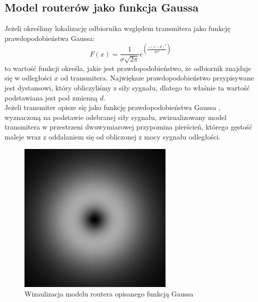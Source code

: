 \subsection{Model routerów jako funkcja Gaussa}
Jeżeli określimy lokalizację odbiornika względem transmitera jako funkcję prawdopodobieństwa Gaussa:
\begin{equation}
F(x) = \frac{1}{\sigma\sqrt{2\pi}}e^{\left(\frac{-(x-d)^2}{2\sigma^2}\right)}
\end{equation}
to wartość funkcji określa, jakie jest prawdopodobieństwo, że odbiornik znajduje się w odległości $x$ od transmitera. Największe prawdopodobieństwo przypisywane jest dystansowi, który obliczyliśmy z siły sygnału, dlatego to właśnie ta wartość podstawiana jest pod zmienną $d$. \cite{JK}\\
Jeżeli transmiter opisze się jako funkcję prawdopodobieństwa Gaussa \cite{YX}, wyznaczoną na podstawie odebranej siły sygnału, zwizualizowany model transmitera w przestrzeni dwuwymiarowej przypomina pierścień, którego gęstość maleje wraz z oddalaniem się od obliczonej z mocy sygnału odległości.
\begin{figure}[H]			
	\centering
	\caption{Wizaulizacja modelu routera opisanego funkcją Gaussa}
	\includegraphics{router_Gaussa_wizualizacja}
\end{figure}
